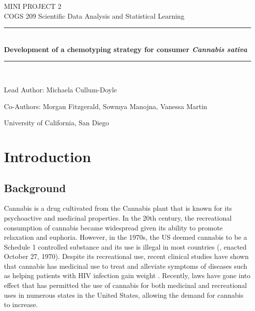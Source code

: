 \documentclass[11pt,a4paper]{article}
\begin{document}
	\begin{titlepage} 
		\begin{center}
		\large{MINI PROJECT 2}\\
		\large {COGS 209 Scientific Data Analysis and Statistical Learning}
		\vspace{3em}
		
		\rule{0.9\linewidth}{0.5mm} \\[0.4cm]
	    {\Large{\bfseries{Development of a chemotyping strategy for consumer \textit{Cannabis sativa}}}} \\
	    \rule{0.9\linewidth}{0.5mm} \\[3 em]	
	    
	    \vspace{5em}

	    Lead Author: Michaela Cullum-Doyle\\

	    \vspace{1em}

	    Co-Authors: Morgan Fitzgerald, Sowmya Manojna, Vanessa Martin \\

		\vspace{25em}

		University of California, San Diego
		
		\vspace{5em}    
	    
		\end{center}
	\end{titlepage}

{\hypersetup{linkcolor=black}
 \tableofcontents}
\break

\section{Introduction}
\subsection{Background}
Cannabis is a drug cultivated from the Cannabis plant that is known for its psychoactive and medicinal properties. In the 20th century, the recreational consumption of cannabis became widespread given its ability to promote relaxation and euphoria. However, in the 1970s, the US deemed cannabis to be a Schedule 1 controlled substance and its use is illegal in most countries (\cite{united1970comprehensive}, enacted October 27, 1970). Despite its recreational use, recent clinical studies have shown that cannabis has medicinal use to treat and alleviate symptoms of diseases such as helping patients with HIV infection gain weight \cite{hill2019medical}. Recently, laws have gone into effect that has permitted the use of cannabis for both medicinal and recreational uses in numerous states in the United States, allowing the demand for cannabis to increase.
\\
\end{document}
